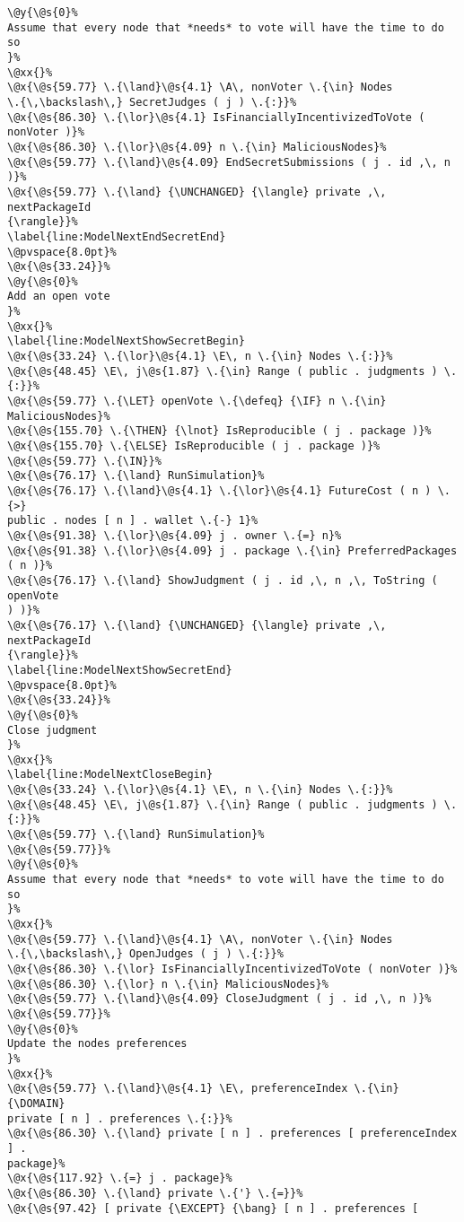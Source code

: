 \begin{lstlisting}[caption=System actor behavior in TLA\textsuperscript+ specification
    , label=lst:ModelSpec]
\@y{\@s{0}%
Assume that every node that *needs* to vote will have the time to do so
}%
\@xx{}%
\@x{\@s{59.77} \.{\land}\@s{4.1} \A\, nonVoter \.{\in} Nodes
\.{\,\backslash\,} SecretJudges ( j ) \.{:}}%
\@x{\@s{86.30} \.{\lor}\@s{4.1} IsFinanciallyIncentivizedToVote ( nonVoter )}%
\@x{\@s{86.30} \.{\lor}\@s{4.09} n \.{\in} MaliciousNodes}%
\@x{\@s{59.77} \.{\land}\@s{4.09} EndSecretSubmissions ( j . id ,\, n )}%
\@x{\@s{59.77} \.{\land} {\UNCHANGED} {\langle} private ,\, nextPackageId
{\rangle}}%
\label{line:ModelNextEndSecretEnd}
\@pvspace{8.0pt}%
\@x{\@s{33.24}}%
\@y{\@s{0}%
Add an open vote
}%
\@xx{}%
\label{line:ModelNextShowSecretBegin}
\@x{\@s{33.24} \.{\lor}\@s{4.1} \E\, n \.{\in} Nodes \.{:}}%
\@x{\@s{48.45} \E\, j\@s{1.87} \.{\in} Range ( public . judgments ) \.{:}}%
\@x{\@s{59.77} \.{\LET} openVote \.{\defeq} {\IF} n \.{\in} MaliciousNodes}%
\@x{\@s{155.70} \.{\THEN} {\lnot} IsReproducible ( j . package )}%
\@x{\@s{155.70} \.{\ELSE} IsReproducible ( j . package )}%
\@x{\@s{59.77} \.{\IN}}%
\@x{\@s{76.17} \.{\land} RunSimulation}%
\@x{\@s{76.17} \.{\land}\@s{4.1} \.{\lor}\@s{4.1} FutureCost ( n ) \.{>}
public . nodes [ n ] . wallet \.{-} 1}%
\@x{\@s{91.38} \.{\lor}\@s{4.09} j . owner \.{=} n}%
\@x{\@s{91.38} \.{\lor}\@s{4.09} j . package \.{\in} PreferredPackages ( n )}%
\@x{\@s{76.17} \.{\land} ShowJudgment ( j . id ,\, n ,\, ToString ( openVote
) )}%
\@x{\@s{76.17} \.{\land} {\UNCHANGED} {\langle} private ,\, nextPackageId
{\rangle}}%
\label{line:ModelNextShowSecretEnd}
\@pvspace{8.0pt}%
\@x{\@s{33.24}}%
\@y{\@s{0}%
Close judgment
}%
\@xx{}%
\label{line:ModelNextCloseBegin}
\@x{\@s{33.24} \.{\lor}\@s{4.1} \E\, n \.{\in} Nodes \.{:}}%
\@x{\@s{48.45} \E\, j\@s{1.87} \.{\in} Range ( public . judgments ) \.{:}}%
\@x{\@s{59.77} \.{\land} RunSimulation}%
\@x{\@s{59.77}}%
\@y{\@s{0}%
Assume that every node that *needs* to vote will have the time to do so
}%
\@xx{}%
\@x{\@s{59.77} \.{\land}\@s{4.1} \A\, nonVoter \.{\in} Nodes
\.{\,\backslash\,} OpenJudges ( j ) \.{:}}%
\@x{\@s{86.30} \.{\lor} IsFinanciallyIncentivizedToVote ( nonVoter )}%
\@x{\@s{86.30} \.{\lor} n \.{\in} MaliciousNodes}%
\@x{\@s{59.77} \.{\land}\@s{4.09} CloseJudgment ( j . id ,\, n )}%
\@x{\@s{59.77}}%
\@y{\@s{0}%
Update the nodes preferences
}%
\@xx{}%
\@x{\@s{59.77} \.{\land}\@s{4.1} \E\, preferenceIndex \.{\in} {\DOMAIN}
private [ n ] . preferences \.{:}}%
\@x{\@s{86.30} \.{\land} private [ n ] . preferences [ preferenceIndex ] .
package}%
\@x{\@s{117.92} \.{=} j . package}%
\@x{\@s{86.30} \.{\land} private \.{'} \.{=}}%
\@x{\@s{97.42} [ private {\EXCEPT} {\bang} [ n ] . preferences [

\end{lstlisting}
